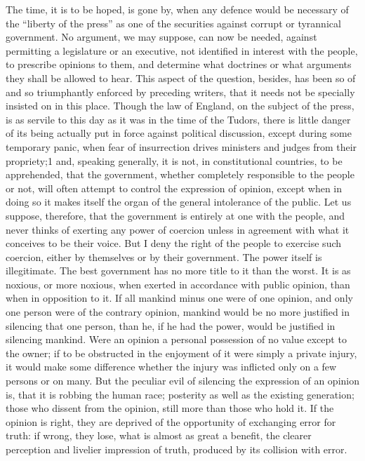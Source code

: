 \documentclass[11pt,openany]{book}
\begin{document}
The time, it is to be hoped, is gone by, when any defence would be necessary of the ``liberty of the press'' as one of the securities against corrupt or tyrannical government. No argument, we may suppose, can now be needed, against permitting a legislature or an executive, not identified in interest with the people, to prescribe opinions to them, and determine what doctrines or what arguments they shall be allowed to hear. This aspect of the question, besides, has been so of and so triumphantly enforced by preceding writers, that it needs not be specially insisted on in this place. Though the law of England, on the subject of the press, is as servile to this day as it was in the time of the Tudors, there is little danger of its being actually put in force against political discussion, except during some temporary panic, when fear of insurrection drives ministers and judges from their propriety;1 and, speaking generally, it is not, in constitutional countries, to be apprehended, that the government, whether completely responsible to the people or not, will often attempt to control the expression of opinion, except when in doing so it makes itself the organ of the general intolerance of the public. Let us suppose, therefore, that the government is entirely at one with the people, and never thinks of exerting any power of coercion unless in agreement with what it conceives to be their voice. But I deny the right of the people to exercise such coercion, either by themselves or by their government. The power itself is illegitimate. The best government has no more title to it than the worst. It is as noxious, or more noxious, when exerted in accordance with public opinion, than when in opposition to it. If all mankind minus one were of one opinion, and only one person were of the contrary opinion, mankind would be no more justified in silencing that one person, than he, if he had the power, would be justified in silencing mankind. Were an opinion a personal possession of no value except to the owner; if to be obstructed in the enjoyment of it were simply a private injury, it would make some difference whether the injury was inflicted only on a few persons or on many. But the peculiar evil of silencing the expression of an opinion is, that it is robbing the human race; posterity as well as the existing generation; those who dissent from the opinion, still more than those who hold it. If the opinion is right, they are deprived of the opportunity of exchanging error for truth: if wrong, they lose, what is almost as great a benefit, the clearer perception and livelier impression of truth, produced by its collision with error.
\end{document}
